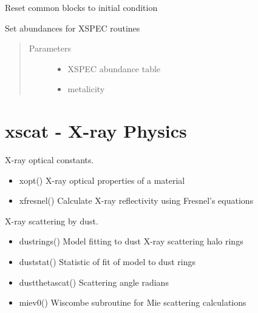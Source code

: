 \documentclass[letterpaper,10pt,english]{sphinxmanual}
\begin{document}

\begin{fulllineitems}
\label{\detokenize{astro_functions:astro.reset}}
Reset common blocks to initial condition

\end{fulllineitems}


\begin{fulllineitems}
\label{\detokenize{astro_functions:astro.setabund}}
Set abundances for XSPEC routines
\begin{quote}\begin{description}
\item[{Parameters}] \leavevmode\begin{itemize}
\item {} 
 \textendash{} XSPEC abundance table

\item {} 
 \textendash{} metalicity

\end{itemize}

\end{description}\end{quote}

\end{fulllineitems}



\chapter{xscat  - X-ray Physics}
\label{\detokenize{xscat:xscat-x-ray-physics}}\label{\detokenize{xscat::doc}}
X-ray optical constants.
\begin{itemize}
\item {} 
xopt() X-ray optical properties of a material

\item {} 
xfresnel() Calculate X-ray reflectivity using Fresnel’s equations

\end{itemize}

X-ray scattering by dust.
\begin{itemize}
\item {} 
dustrings() Model fitting to dust X-ray scattering halo rings

\item {} 
duststat() Statistic of fit of model to dust rings

\item {} 
dustthetascat() Scattering angle radians

\item {} 
miev0() Wiscombe subroutine for Mie scattering calculations

\end{itemize}
\end{document}
